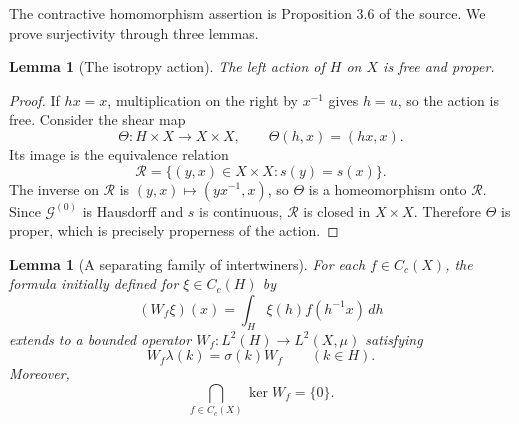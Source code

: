\documentclass[11pt]{article}
\newtheorem{lemma}[theorem]{Lemma}
\theoremstyle{remark}
\newcommand{\G}{\mathcal G}
\begin{document}
The contractive homomorphism assertion is Proposition 3.6 of the source.  We
prove surjectivity through three lemmas.

\begin{lemma}[The isotropy action]\label{lem:proper}
The left action of $H$ on $X$ is free and proper.
\end{lemma}

\begin{proof}
If $hx=x$, multiplication on the right by $x^{-1}$ gives $h=u$, so the action
is free. Consider the shear map
\[
 \Theta:H\times X\longrightarrow X\times X,\qquad \Theta(h,x)=(hx,x).
\]
Its image is the equivalence relation
\[
 \mathcal R=\{(y,x)\in X\times X:s(y)=s(x)\}.
\]
The inverse on $\mathcal R$ is $(y,x)\mapsto(yx^{-1},x)$, so $\Theta$ is a
homeomorphism onto $\mathcal R$.  Since $\G^{(0)}$ is Hausdorff and $s$ is
continuous, $\mathcal R$ is closed in $X\times X$. Therefore $\Theta$ is
proper, which is precisely properness of the action.
\end{proof}

\begin{lemma}[A separating family of intertwiners]\label{lem:W}
For each $f\in C_c(X)$, the formula initially defined for $\xi\in C_c(H)$ by
\begin{equation}\label{eq:W}
       (W_f\xi)(x)=\int_H \xi(h)f(h^{-1}x)\,dh
\end{equation}
extends to a bounded operator $W_f:L^2(H)\to L^2(X,\mu)$ satisfying
\[
       W_f\lambda(k)=\sigma(k)W_f\qquad(k\in H).
\]
Moreover,
\[
       \bigcap_{f\in C_c(X)}\ker W_f=\{0\}.
\]
\end{lemma}
\end{document}
